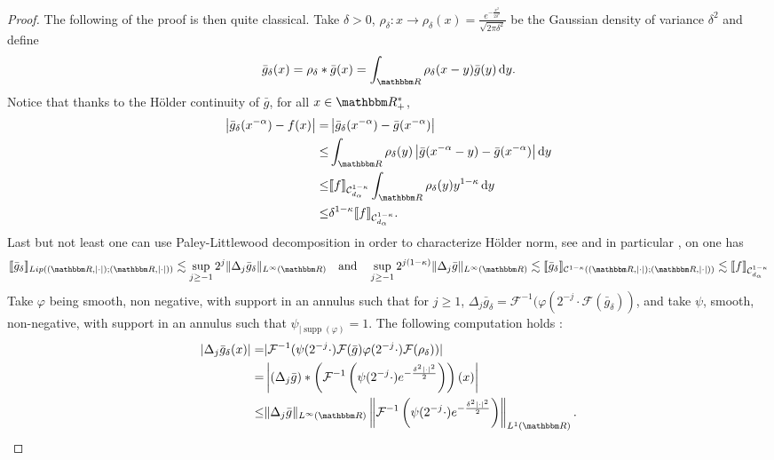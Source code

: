 \documentclass[a4paper,11pt, reqno]{amsart}
\newcommand{\cC}{\mathcal{C}}	\newcommand{\CC}{\mathbbm{C}}
\newcommand{\cF}{\mathcal{F}}	\newcommand{\FF}{\mathbbm{F}}
\newcommand{\dd}{\mathop{}\!\mathrm{d}}
\newcommand{\1}{\mathbbm{1}}
\theoremstyle{plain}
\theoremstyle{definition}
\begin{document}
\begin{proof}
    The following of the proof is then quite classical. Take $\delta>0$, $\rho_\delta : x \to \rho_\delta(x)= \frac{e^{-\frac{x^2}{2\delta^2}}}{\sqrt{2\pi \delta^2}}$ be the Gaussian density of variance $\delta^2$ and define 
    \[\bar{g}_\delta(x) = \rho_\delta * \bar{g}(x) = \int_{\RR} \rho_\delta(x-y) \bar{g}(y) \dd y.\]
    Notice that thanks to the Hölder continuity of $\bar{g}$, for all $x\in \RR_+^*$, 
    \begin{align*}
        \left|\bar{g}_\delta(x^{-\alpha}) - f(x) \right|= &\left|\bar{g}_\delta(x^{-\alpha}) - \bar{g}(x^{-\alpha}) \right|\\
        \le & \int_{\RR} \rho_\delta(y) \left|\bar{g}(x^{-\alpha}-y) - \bar{g}(x^{-\alpha}) \right| \dd y \\
        \le & \llbracket f \rrbracket_{\cC^{1-\kappa}_{d_\alpha}} \int_{\RR} \rho_\delta(y) y^{1-\kappa} \dd y \\
        \le & \delta^{1-\kappa} \llbracket f \rrbracket_{\cC^{1-\kappa}_{d_\alpha}}.
    \end{align*}
    Last but not least one can use Paley-Littlewood decomposition in order to characterize H\"older norm, see \cite[Chapter 2]{bahouriFourierAnalysisNonlinear2011} and in particular \cite[Theorem 2.36]{bahouriFourierAnalysisNonlinear2011}, on one has 
    \[\llbracket \bar{g}_\delta\rrbracket_{Lip((\RR,|\cdot|);(\RR,|\cdot|))} \lesssim \sup_{j\ge -1} 2^{j}\|\Delta_j \bar{g}_\delta\|_{L^\infty(\RR)} \quad \text{and}\quad \sup_{j\ge -1} 2^{j(1-\kappa)}\|\Delta_j \bar{g}\|_{L^\infty(\RR)} \lesssim \llbracket \bar{g}_\delta\rrbracket_{\cC^{1-\kappa}((\RR,|\cdot|);(\RR,|\cdot|))} \lesssim \llbracket f\rrbracket_{\cC^{1-\kappa}_{d_\alpha}}\]
    Take $\varphi$ being smooth, non negative, with support in an annulus such that for $j\ge 1$, $\Delta_j \bar{g}_\delta = \cF^{-1}(\varphi(2^{-j}\cdot \cF(\bar{g}_\delta))$, and take $\psi$, smooth, non-negative, with support in an annulus such that $\psi_{|\mathop{supp}(\varphi)} = 1$.
    The following computation holds : 
    \begin{align*}
        |\Delta_j \bar{g}_\delta(x)| = & |\cF^{-1}(\psi(2^{-j}\cdot)\cF(\bar{g}) \varphi(2^{-j}\cdot) \cF(\rho_\delta))| \\
        = & \left|(\Delta_j \bar{g})*\left( \cF^{-1}\left(\psi(2^{-j} \cdot) e^{-\frac{\delta^2 |\cdot|^2}{2}}\right)\right)(x)\right|\\
        \le & \|\Delta_j\bar{g}\|_{L^\infty(\RR)} \left\| \cF^{-1}\left(\psi(2^{-j} \cdot) e^{-\frac{\delta^2 |\cdot|^2}{2}}\right)\right\|_{L^1(\RR)}.

\end{align*}
\end{proof}
\end{document}
